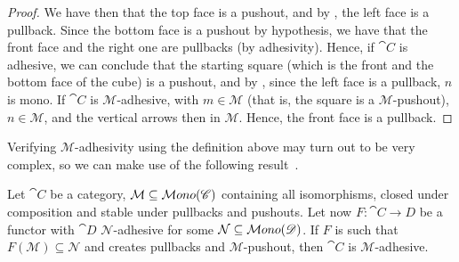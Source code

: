\begin{proof}
	We have then that the top face is a pushout, and by , the left face is a pullback. Since the bottom face is a pushout by hypothesis, we have that the front face and the right one are pullbacks (by adhesivity). Hence, if $\cat C$ is adhesive, we can conclude that the starting square (which is the front and the bottom face of the cube) is a pushout, and by , since the left face is a pullback, $n$ is mono. If $\cat C$ is $\mathcal M$-adhesive, with $m \in \mathcal{M}$ (that is, the square is a $\mathcal{M}$-pushout), $n \in \mathcal M$, and the vertical arrows then in $\mathcal{M}$. Hence, the front face is a pullback.
\iffalse
	Suppose now that $\cat C$ is $\mathcal{M}$-adhesive, and let the following square be a $\mathcal{M}$-pushout, so $m, n \in \mathcal{M}$.
	\[\begin{tikzcd}[row sep = 26, column sep = 26]
		A \ar[r, "f"] \ar[d, "m"swap] & B \ar[d, "n"] \\
		C \ar[r, "g"swap] & D
	\end{tikzcd}\]
	Consider now the following cube.
	\[\begin{tikzcd}[row sep = 20, column sep = 20]
	& A && B \\
	A && B \\
	& A && B \\
	C && D \\
	& {}
	\arrow["f", from=1-2, to=1-4]
	\arrow["{id_A}"', from=1-2, to=2-1]
	\arrow["{id_A}"'{pos=0.7}, from=1-2, to=3-2]
	\arrow["{id_B}"', from=1-4, to=2-3]
	\arrow["{id_B}", from=1-4, to=3-4]
	\arrow["m"', from=2-1, to=4-1]
	\arrow["f"{pos=0.7}, from=3-2, to=3-4]
	\arrow["m"', from=3-2, to=4-1]
	\arrow["n", from=3-4, to=4-3]
	\arrow["g"', from=4-1, to=4-3]
	\arrow["f"{pos=0.7}, from=2-1, to=2-3, crossing over]
	\arrow["n"'{pos=0.7}, from=2-3, to=4-3, crossing over]
	\end{tikzcd}\]
	By the same argument as before, we can conclude that the starting square is a pullback.\fi
\end{proof}

Verifying $\mathcal M$-adhesivity using the definition above may turn out to be very complex, so we can make use of the following result~\cite{castelnovo2022newcriterionmathcalmmathcalnadhesivity}. 

\begin{theorem}\label{th:crit_for_adh}
    Let $\cat C$ be a category, $\mathcal M \subseteq \mathcal{M}ono(\mathscr{C})$ containing all isomorphisms, closed under composition and stable under pullbacks and pushouts. Let now $F: \cat{C \rightarrow D}$ be a functor with $\cat D$ $\mathcal{N}$-adhesive for some $\mathcal{N} \subseteq \mathcal{M}ono(\mathscr{D})$.
    If $F$ is such that $F(\mathcal{M}) \subseteq \mathcal N$ and creates pullbacks and $\mathcal{M}$-pushout, then $\cat C$ is $\mathcal M$-adhesive.
\end{theorem}


